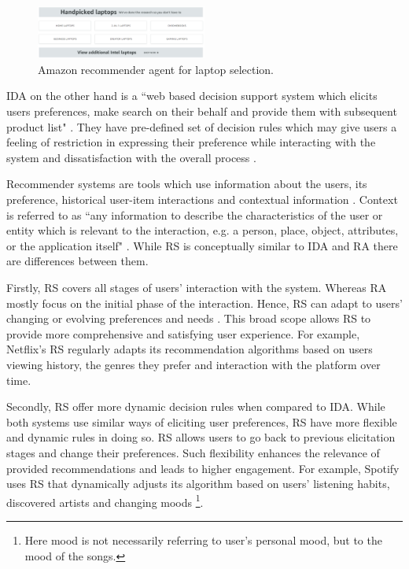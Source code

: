 \documentclass[a4paper,12pt]{article}
\begin{document}
\begin{figure}[H]
    \centering
    \includegraphics[width=0.5\textwidth]{staticFiles/amazonLaptopHandpicked.PNG}
    \caption{Amazon recommender agent for laptop selection.}
    \label{fig:amazonRA}
\end{figure}

IDA on the other hand is a ``web based decision support system which elicits users preferences, make search on their behalf and provide them with subsequent product list" \citep{maes1999agents}. They have pre-defined set of decision rules which may give users a feeling of restriction in expressing their preference while interacting with the system and dissatisfaction with the overall process \citep{wang2009interactive, silver1988user}.

Recommender systems are tools which use information about the users, its preference, historical user-item interactions and contextual information \citep{adomavicius2005toward}. Context is referred to as ``any information to describe the characteristics of the user or entity which is relevant to the interaction, e.g. a person, place, object, attributes, or the application itself" \citep{dey2001understanding}.  While RS is conceptually similar to IDA and RA there are differences between them.

Firstly, RS covers all stages of users' interaction with the system. Whereas RA mostly focus on the initial phase of the interaction. Hence, RS can adapt to users' changing or evolving preferences and needs \citep{songWhenHowDiversify2019}. This broad scope allows RS to provide more comprehensive and satisfying user experience. For example, Netflix's RS regularly adapts its recommendation algorithms based on users viewing history, the genres they prefer and interaction with the platform over time.  

Secondly, RS offer more dynamic decision rules when compared to IDA. While both systems use similar ways of eliciting user preferences, RS have more flexible and dynamic rules in doing so. RS allows users to go back to previous elicitation stages and change their preferences. Such flexibility enhances the relevance of provided recommendations and leads to higher engagement. For example, Spotify uses RS that dynamically adjusts its algorithm based on users' listening habits, discovered artists and changing moods \footnote{Here mood is not necessarily referring to user's personal mood, but to the mood of the songs.}. 
\end{document}
